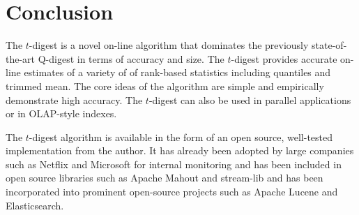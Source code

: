 \documentclass[11pt]{amsart}
\begin{document}
\section{Conclusion}
The $t$-digest is a novel on-line algorithm that dominates the previously state-of-the-art Q-digest in terms of accuracy and size.  The $t$-digest provides accurate on-line estimates of a variety of of rank-based statistics including quantiles and trimmed mean.  The core ideas of the algorithm are simple and empirically demonstrate high accuracy.  The $t$-digest can also be used in parallel applications or in OLAP-style indexes.  

The $t$-digest algorithm is available in the form of an open source, well-tested implementation from the author.  It has already been adopted by large companies such as Netflix and Microsoft for internal monitoring and has been included in open source libraries such as Apache Mahout and stream-lib and has been incorporated into prominent open-source projects such as Apache Lucene and Elasticsearch.


{}
\end{document}
